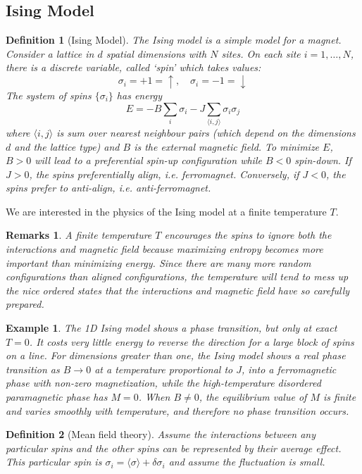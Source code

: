\documentclass[a4paper]{article}
\newtheorem{eg}{Example}[section]
\newtheorem{remarks}{Remarks}[section]
\theoremstyle{new}
\newtheorem{defi}{Definition}[section]
\begin{document}
\subsection{Ising Model}
\begin{defi}[Ising Model]
The Ising model is a simple model for a magnet. Consider a lattice in $d$ spatial dimensions with $N$ sites. On each site $i=1,\dots,N$, there is a discrete variable, called `spin' which takes values:
$$\sigma_i=+1=\uparrow,\quad \sigma_i=-1=\downarrow$$
The system of spins $\{\sigma_i\}$ has energy
$$E=-B\sum_i\sigma_i-J\sum_{\langle i,j\rangle}\sigma_i\sigma_j$$
where $\langle i,j\rangle$ is sum over nearest neighbour pairs (which depend on the dimensions $d$ and the lattice type) and $B$ is the external magnetic field. To minimize $E$, $B>0$ will lead to a preferential spin-up configuration while $B<0$ spin-down. If $J>0$, the spins preferentially align, i.e. ferromagnet. Conversely, if $J<0$, the spins prefer to anti-align, i.e. anti-ferromagnet.
\end{defi}
We are interested in the physics of the Ising model at a finite temperature $T$.
\begin{remarks}
A finite temperature $T$ encourages the spins to ignore both the interactions and magnetic field because maximizing entropy becomes more important than minimizing energy. Since there are many more random configurations than aligned configurations, the temperature will tend to mess up the nice ordered states that the interactions and magnetic field have so carefully prepared.
\end{remarks}
\begin{eg}
The 1D Ising model shows a phase transition, but only at exact $T=0$. It costs very little energy to reverse the direction for a large block of spins on a line. For dimensions greater than one, the Ising model shows a real phase transition as $B\rightarrow 0$ at a temperature proportional to $J$, into a ferromagnetic phase with non-zero magnetization, while the high-temperature disordered paramagnetic phase has $M=0$. When $B\neq 0$, the equilibrium value of $M$ is finite and varies smoothly with temperature, and therefore no phase transition occurs.
\end{eg}
\begin{defi}[Mean field theory]
Assume the interactions between any particular spins and the other spins can be represented by their average effect. This particular spin is $\sigma_i=\langle\sigma\rangle+\delta\sigma_i$ and assume the fluctuation is small.
\end{defi}
\end{document}
